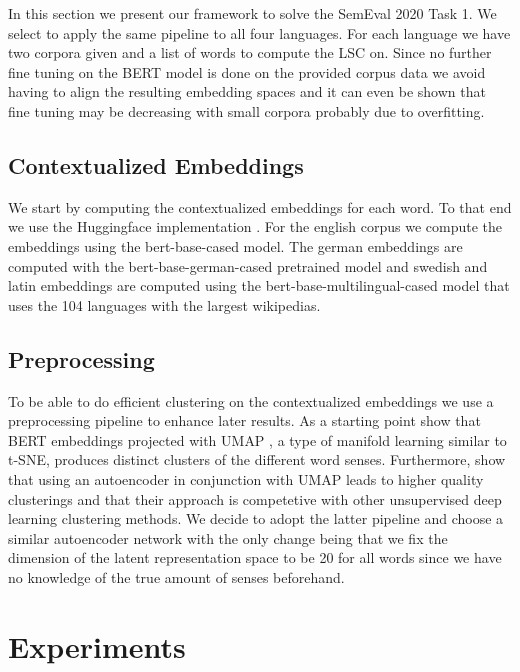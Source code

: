 \documentclass[11pt]{article}
\begin{document}
In this section we present our framework to solve the SemEval 2020 Task 1. 
We select to apply the same pipeline to all four languages. For each language we have two corpora
given and a list of words to compute the LSC on. Since no further fine tuning 
on the BERT model is done on the provided 
corpus data we avoid having to align the resulting embedding spaces and it can even be shown that fine tuning may be decreasing
with small corpora \cite{giulianelli2019lexical} probably due to overfitting. 

\subsection{Contextualized Embeddings}

We start by computing the contextualized embeddings for each word. To that end we use 
the Huggingface implementation \cite{Wolf2019HuggingFacesTS}. For the english corpus we compute the embeddings using the
bert-base-cased model. The german embeddings are computed with the bert-base-german-cased
pretrained model and swedish and latin embeddings are computed using the bert-base-multilingual-cased model that uses the 104 languages with the largest wikipedias.

\subsection{Preprocessing}

To be able to do efficient clustering on the contextualized embeddings we use a preprocessing pipeline to
enhance later results. 
As a starting point \cite{reif2019visualizing} show that BERT embeddings projected with UMAP \cite{mcinnes2018umap}, a type of manifold learning similar to t-SNE,
produces distinct clusters of the different word senses. 
Furthermore, \cite{mcconville2019n2d} show that using an autoencoder in conjunction with UMAP
leads to higher quality clusterings and that their approach is competetive with other unsupervised deep learning clustering methods.
We decide to adopt the latter pipeline and choose a similar autoencoder network with the only change being that we fix the dimension of the latent representation space to be 20 for all words
since we have no knowledge of the true amount of senses beforehand.


\section{Experiments}
\end{document}
